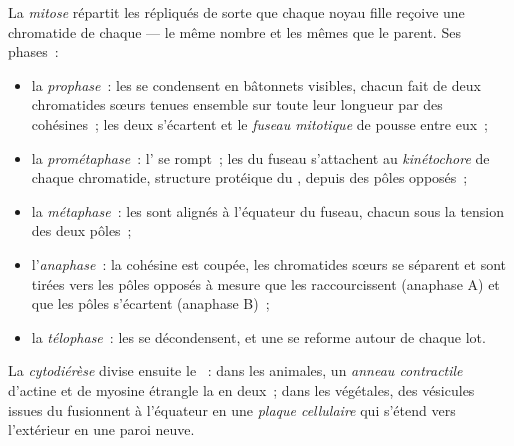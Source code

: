 \begin{definition}[Mitose]\label{def:b1:replication-mitosis:mitosis}
La \emph{mitose} répartit les  répliqués de sorte que chaque
noyau fille reçoive une chromatide de chaque  --- le même
nombre et les mêmes  que le parent. Ses phases~:
\begin{itemize}
  \item la \emph{prophase}~: les  se condensent en bâtonnets
        visibles, chacun fait de deux chromatides sœurs tenues ensemble
        sur toute leur longueur par des  cohésines~; les deux
        \emph{} s'écartent et le \emph{fuseau mitotique} de
         pousse entre eux~;
  \item la \emph{prométaphase}~: l' se rompt~; les
         du fuseau s'attachent au \emph{kinétochore} de
        chaque chromatide, structure protéique du , depuis des
        pôles opposés~;
  \item la \emph{métaphase}~: les  sont alignés à l'équateur
        du fuseau, chacun sous la tension des deux pôles~;
  \item l'\emph{anaphase}~: la cohésine est coupée, les chromatides
        sœurs se séparent et sont tirées vers les pôles opposés à mesure
        que les  raccourcissent (anaphase A) et que les
        pôles s'écartent (anaphase B)~;
  \item la \emph{télophase}~: les  se décondensent, et une
         se reforme autour de chaque lot.
\end{itemize}
La \emph{cytodiérèse} divise ensuite le ~: dans les 
animales, un \emph{anneau contractile} d'actine et de myosine étrangle
la  en deux~; dans les  végétales, des vésicules issues
du  fusionnent à l'équateur en une \emph{plaque cellulaire} qui
s'étend vers l'extérieur en une paroi neuve.
\end{definition}

